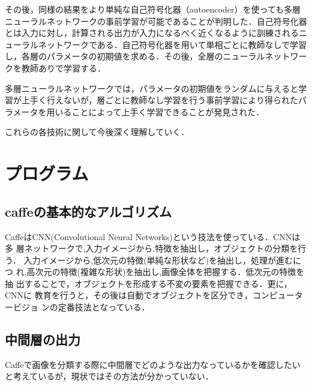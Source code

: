\documentclass[a4paper,10pt]{jsarticle}
\begin{document}
その後，同様の結果をより単純な自己符号化器（autoencoder）を使っても多層ニューラルネットワークの事前学習が可能であることが判明した．自己符号化器とは入力に対し，計算される出力が入力になるべく近くなるように訓練されるニューラルネットワークである．自己符号化器を用いて単相ごとに教師なしで学習し，各層のパラメータの初期値を求める．その後，全層のニューラルネットワークを教師ありで学習する．

多層ニューラルネットワークでは，パラメータの初期値をランダムに与えると学習が上手く行えないが，層ごとに教師なし学習を行う事前学習により得られたパラメータを用いることによって上手く学習できることが発見された．

これらの各技術に関して今後深く理解していく．
\section{プログラム}

\subsection{caffeの基本的なアルゴリズム}
CaffeはCNN(Convolutional Neural Networks)という技法を使っている．CNNは多
層ネットワークで,入力イメージから,特徴を抽出し，オブジェクトの分類を行う．
入力イメージから,低次元の特徴(単純な形状など)を抽出し，処理が進むにつ
れ,高次元の特徴(複雑な形状)を抽出し,画像全体を把握する．低次元の特徴を抽
出することで，オブジェクトを形成する不変の要素を把握できる．更に，CNNに
教育を行うと，その後は自動でオブジェクトを区分でき，コンピュータービジョ
ンの定番技法となっている．

\subsection{中間層の出力}
Caffeで画像を分類する際に中間層でどのような出力なっているかを確認したいと考えているが，現状ではその方法が分かっていない．

\end{document}
